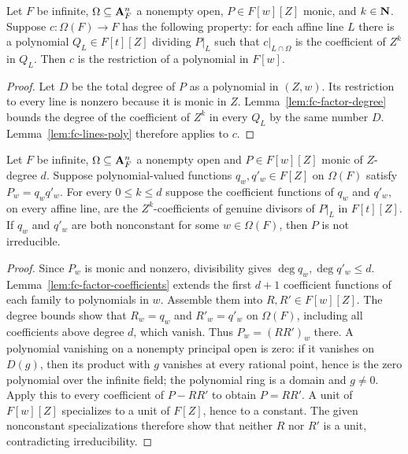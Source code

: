 \begin{lemma}\label{lem:fc-factor-coefficients}
\leanok
{}
Let $F$ be infinite, $\Omega\subseteq\mathbf{A}^n_F$ a nonempty open, $P\in F[w][Z]$ monic, and $k\in\mathbf{N}$.
Suppose $c\colon\Omega(F)\to F$ has the following property: for each affine line $L$ there is a polynomial
$Q_L\in F[t][Z]$ dividing $P|_L$ such that $c|_{L\cap\Omega}$ is the coefficient of $Z^k$ in $Q_L$.
Then $c$ is the restriction of a polynomial in $F[w]$.
\end{lemma}

\begin{proof}
Let $D$ be the total degree of $P$ as a polynomial in $(Z,w)$. Its restriction to every line is nonzero
because it is monic in $Z$. Lemma~\ref{lem:fc-factor-degree} bounds the degree of the coefficient of $Z^k$
in every $Q_L$ by the same number $D$. Lemma~\ref{lem:fc-lines-poly} therefore applies to $c$.
\end{proof}

\begin{lemma}\label{lem:fc-factor-families}
\leanok
{}
Let $F$ be infinite, $\Omega\subseteq\mathbf{A}^n_F$ a nonempty open and $P\in F[w][Z]$ monic of $Z$-degree $d$.
Suppose polynomial-valued functions $q_w,q'_w\in F[Z]$ on $\Omega(F)$ satisfy $P_w=q_wq'_w$.
For every $0\le k\le d$ suppose the coefficient functions of $q_w$ and $q'_w$, on every affine line,
are the $Z^k$-coefficients of genuine divisors of $P|_L$ in $F[t][Z]$.
If $q_w$ and $q'_w$ are both nonconstant for some $w\in\Omega(F)$, then $P$ is not irreducible.
\end{lemma}

\begin{proof}
Since $P_w$ is monic and nonzero, divisibility gives $\deg q_w,\deg q'_w\le d$.
Lemma~\ref{lem:fc-factor-coefficients} extends the first $d+1$ coefficient functions of each family to
polynomials in $w$. Assemble them into $R,R'\in F[w][Z]$. The degree bounds show that $R_w=q_w$ and
$R'_w=q'_w$ on $\Omega(F)$, including all coefficients above degree $d$, which vanish.
Thus $P_w=(RR')_w$ there. A polynomial vanishing on a nonempty principal open is zero:
if it vanishes on $D(g)$, then its product with $g$ vanishes at every rational point, hence is the zero
polynomial over the infinite field; the polynomial ring is a domain and $g\ne0$.
Apply this to every coefficient of $P-RR'$ to obtain $P=RR'$.
A unit of $F[w][Z]$ specializes to a unit of $F[Z]$, hence to a constant. The given nonconstant
specializations therefore show that neither $R$ nor $R'$ is a unit, contradicting irreducibility.
\end{proof}

